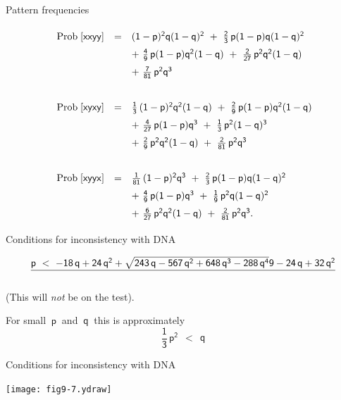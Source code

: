 \documentclass[bluish,slideColor,colorBG,pdf]{prosper}
\def\prob{{\rm \;Prob\;}}
\begin{document}
\begin{slide}[Replace]{Pattern frequencies}

\noindent
\[
\renewcommand{\arraystretch}{1.5}
\begin{array}{c c l}
\mathsf{\prob[xxyy]} &  \mathsf{=} & \mathsf{(1-p)^2q(1-q)^2\ +\ \frac{2}{3}\,p(1-p)q(1-q)^2}\\
& &  \mathsf{+\ \frac{4}{9}\,p(1-p)q^2(1-q)\ +\ \frac{2}{27}\,p^2q^2(1-q)}\\
& &  \mathsf{+\ \frac{7}{81}\,p^2q^3}\\
& & \\
\mathsf{\prob[xyxy]} &  \mathsf{=} & \mathsf{\frac{1}{3}\,(1-p)^2q^2(1-q)\ +\ \frac{2}{9}\,p(1-p)q^2(1-q)}\\
& & \mathsf{+\ \frac{4}{27}\,p(1-p)q^3\ +\ \frac{1}{3}\,p^2(1-q)^3\ } \\
& & \mathsf{+\ \frac{2}{9}\,p^2q^2(1-q)\ +\ \frac{2}{81}\,p^2q^3}\\
& & \\
\mathsf{\prob[xyyx]} & \mathsf{=} &  \mathsf{\frac{1}{81}\,(1-p)^2q^3\ +\ \frac{2}{3}\,p(1-p)q(1-q)^2}\\
& & \mathsf{+\ \frac{4}{9}\,p(1-p)q^3\ +\ \frac{1}{9}\,p^2q(1-q)^2}\\
& & \mathsf{+\ \frac{6}{27}\,p^2q^2(1-q)\ +\ \frac{2}{81}\,p^2q^3}.
\end{array}
\]

\end{slide}

\begin{slide}[Replace]{Conditions for inconsistency with DNA}
{~~}
\vfill

\noindent
\[
\mathsf{\frac{p\ <\ {{-18\,q + 24\,{q^2} + {\sqrt{243\,q - 567\,{q^2} + 648\,{q^3} -
288\,{q^4}}}}}{{9 - 24\,q + 32\,{q^2}}}}}
\]
\bigskip

(This will {\it not} be on the test).
\bigskip

For small $\mathsf{~p~}$ and $\mathsf{~q~}$ this is approximately
\[
\mathsf{\frac{1}{3}\,p^2 \ \ < \ \ q}
\]

\vfill

\vfill

\end{slide}

\begin{slide}[Replace]{Conditions for inconsistency with DNA}

\centerline{\texttt{[image: fig9-7.ydraw]}}

\end{slide}
\end{document}
